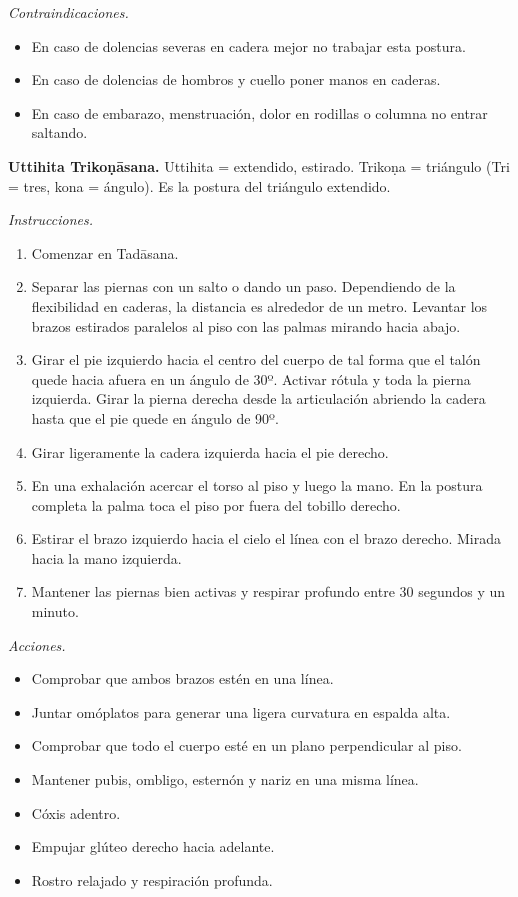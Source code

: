 \emph{Contraindicaciones.}
\begin{itemize}
\item En caso de dolencias severas en cadera
mejor no trabajar esta postura.
\item En caso de dolencias de hombros y
cuello poner manos en caderas.
\item En caso de embarazo, menstruación,
dolor en rodillas o columna no entrar
saltando.
\end{itemize}

\medskip\noindent\textbf{Uttihita
Trikoṇāsana.}
Uttihita = extendido, estirado. Trikoṇa =
triángulo (Tri = tres, kona = ángulo). Es la
postura del triángulo extendido.

\emph{Instrucciones.}
\begin{enumerate}
\item Comenzar en Tadāsana.
\item Separar las piernas con un salto o
dando un paso. Dependiendo de la flexibilidad
en caderas, la distancia es alrededor de un
metro. Levantar los brazos estirados
paralelos al piso con las palmas mirando
hacia abajo.
\item Girar el pie izquierdo hacia el centro
del cuerpo de tal forma que el talón quede
hacia afuera en un ángulo de 30º. Activar
rótula y toda la pierna izquierda. Girar la
pierna derecha desde la articulación abriendo
la cadera hasta que el pie quede en ángulo de
90º.
\item Girar ligeramente la
cadera izquierda hacia el pie derecho.
\item En una exhalación acercar el torso al
piso y luego la mano. En la postura completa
la palma toca el piso por fuera del tobillo
derecho.
\item Estirar el brazo izquierdo hacia el
cielo el línea con el brazo derecho. Mirada
hacia la mano izquierda.
\item Mantener las piernas bien activas y
respirar profundo entre 30 segundos y un
minuto.
\end{enumerate}

\emph{Acciones.}
\begin{itemize}
\item Comprobar que ambos brazos estén en una
línea.
\item Juntar omóplatos para generar una
ligera curvatura en espalda alta.
\item Comprobar que todo el cuerpo esté en un
plano perpendicular al piso.
\item Mantener pubis, ombligo, esternón y
nariz en una misma línea.
\item Cóxis adentro.
\item Empujar glúteo derecho hacia adelante.
\item Rostro relajado y respiración profunda.
\end{itemize}

